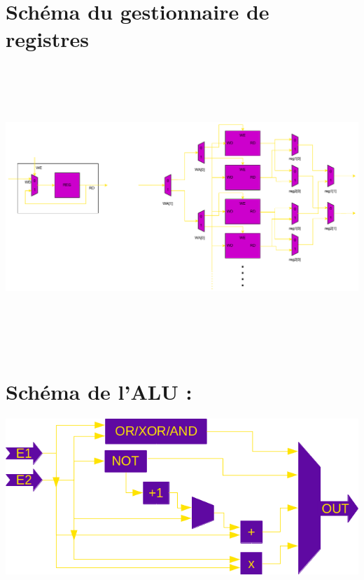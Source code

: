 \documentclass{article}
\begin{document}
		\section{Schéma du gestionnaire de registres}
		\includegraphics[width=14.8cm,height=10.6cm,page=1]{gestionnaire_registres.pdf}
		\newpage
		\section{Schéma de l'ALU :}
		\includegraphics[scale=0.75]{ual.png}
		\newpage
\end{document}
